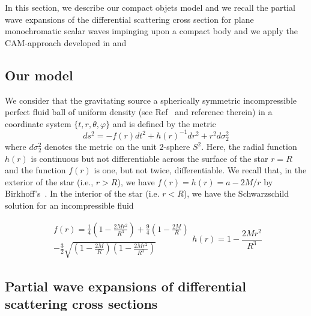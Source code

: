 \documentclass[aps,prd,longbibliography,reprint,twocolumn,amsmath,amssymb,amsfonts,showpacs,superscriptaddress]{revtex4-1}%
\begin{document}
In this section, we describe our compact objets model and we recall the partial wave expansions of the differential scattering cross section for plane monochromatic scalar waves impinging upon a compact body and we apply the CAM-approach developed in \cite{Folacci:2019cmc} and \cite{Folacci:2019vtt}

\subsection{Our model}
\label{SecIIa}

  We consider that the gravitating source a spherically symmetric incompressible perfect fluid ball of uniform
density (see Ref~\cite{Dolan:2017rtj} and reference therein) in a coordinate system $\{t,r,\theta,\varphi\}$ and is defined by the metric
\begin{equation}\label{Line_elem}
  ds^2= -f(r) dt^2+h(r)^{-1}dr^2+r^2d\sigma_2^2
\end{equation}
where $d\sigma_2^2$ denotes the metric on the unit 2-sphere $S^2$. Here, the radial function $h(r)$ is continuous but not differentiable across the surface of the star $r=R$ and the function $f(r)$ is one, but not twice, differentiable. We recall that, in the exterior of the star (i.e., $r>R$), we have $f(r)=h(r)=a-2M/r$ by Birkhoff's~\cite{VojeJohansen:2005nd}. In the interior of the star (i.e. $r<R$), we have the Schwarzschild solution for an incompressible fluid~\cite{Shapiro1983}

\begin{subequations}\label{Interior_Solution}
\begin{align}\label{Interior_Solution_f}
    f(r) =\frac{1}{4}\left(1-\frac{2 M r^2}{R^3}\right)+\frac{9}{4}\left(1-\frac{2M}{R}\right) \nonumber\\ -\frac{3}{2}
                \sqrt{\left(1-\frac{2M}{R}\right)\left(1-\frac{2 M r^2}{R^3}\right)}
\end{align}
\begin{equation}\label{Interior_Solution_h}
 h(r) =1-\frac{2 M r^2}{R^3}
\end{equation}
\end{subequations}


\subsection{Partial wave expansions of differential scattering cross sections}
\label{SecIIb}
\end{document}
